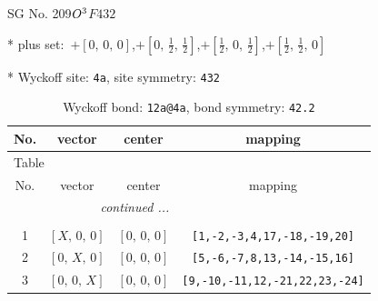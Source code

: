 \documentclass[fleqn,8pt]{jsarticle}
\begin{document}
\setcounter{MaxMatrixCols}{32}

\renewcommand{\tablename}{Table~}
\renewcommand{\figurename}{Figure~}
\begin{center}
\LARGE
SG No. 209\quad$O_{\rm }^{3}$\quad$F432$\quad[ cubic ]
\end{center}

* plus set:\,\,\,$+\left[ 0,\, 0,\, 0 \right]$,\quad $+\left[ 0,\, \frac{1}{2},\, \frac{1}{2} \right]$,\quad $+\left[ \frac{1}{2},\, 0,\, \frac{1}{2} \right]$,\quad $+\left[ \frac{1}{2},\, \frac{1}{2},\, 0 \right]$


* Wyckoff site: {\tt 4a}, site symmetry: {\tt 432}
\renewcommand{\arraystretch}{1.2}
\begin{longtable}{cccc}
\caption{Wyckoff bond: {\tt 12a@4a}, bond symmetry: {\tt 42.2}}
 \\
 \hline \hline
No. & vector & center & mapping \\ \hline \endfirsthead

\multicolumn{3}{l}{\tablename\ \thetable{}} \\
 \hline \hline
No. & vector & center & mapping \\ \hline \endhead

 \hline \hline
\multicolumn{3}{r}{\footnotesize\it continued ...} \\ \endfoot

 \hline \hline
\multicolumn{3}{r}{} \\ \endlastfoot

1 & $\left[ X,\, 0,\, 0 \right]$ & $\left[ 0,\, 0,\, 0 \right]$ & {\tt [1,-2,-3,4,17,-18,-19,20]} \\ \hline
2 & $\left[ 0,\, X,\, 0 \right]$ & $\left[ 0,\, 0,\, 0 \right]$ & {\tt [5,-6,-7,8,13,-14,-15,16]} \\ \hline
3 & $\left[ 0,\, 0,\, X \right]$ & $\left[ 0,\, 0,\, 0 \right]$ & {\tt [9,-10,-11,12,-21,22,23,-24]} \\
\end{longtable}
\renewcommand{\arraystretch}{1.2}
\end{document}

